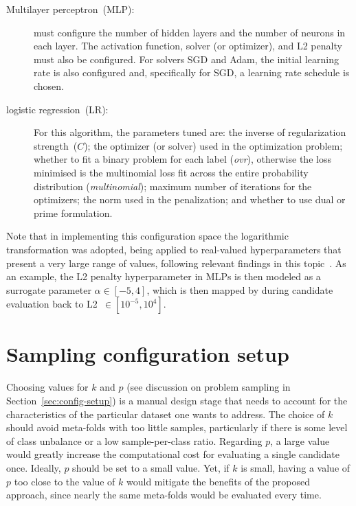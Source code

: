 \begin{description}
\item[Multilayer perceptron~(MLP):]
\irace must configure the number of hidden layers and the number of neurons in each layer. The activation function, solver (or optimizer), and L2 penalty must also be configured. For solvers SGD and Adam, the initial learning rate is also configured and, specifically for SGD, a learning rate schedule is chosen.

\item[logistic regression~(LR):]
For this algorithm, the parameters tuned are: the inverse of regularization strength~($C$); the optimizer (or solver) used in the optimization problem; whether to fit a binary problem for each label (\textit{ovr}), otherwise the loss minimised is the multinomial loss fit across the entire probability distribution (\textit{multinomial}); maximum number of iterations for the optimizers; the norm used in the penalization; and whether to use dual or prime formulation.
\end{description}

Note that in implementing this configuration space the logarithmic transformation was adopted, being applied to real-valued hyperparameters that present a very large range of values, following relevant findings in this topic~\cite{franzin2017effect}. As an example, the L2 penalty hyperparameter in MLPs is then modeled as a surrogate parameter $\alpha \in [-5,4]$, which is then mapped by \isklearn during candidate evaluation back to \mbox{L2 $\in [10^{-5}, 10^4]$}.

\section{Sampling configuration setup}
\label{app:sampling-conf}

Choosing values for $k$ and $p$ (see discussion on problem sampling in Section~\ref{sec:config-setup}) is a manual design stage that needs to account for the characteristics of the particular dataset one wants to address. The choice of $k$ should avoid meta-folds with too little samples, particularly if there is some level of class unbalance or a low sample-per-class ratio. Regarding $p$, a large value would greatly increase the computational cost for evaluating a single candidate once. Ideally, $p$ should be set to a small value. Yet, if $k$ is small, having a value of $p$ too close to the value of $k$ would mitigate the benefits of the proposed approach, since nearly the same meta-folds would be evaluated every time. 